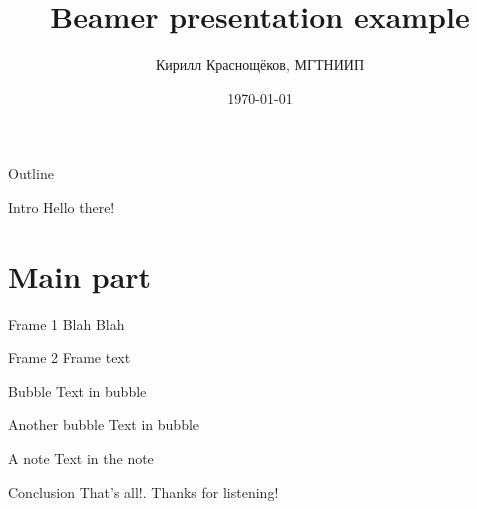 \documentclass[bigger]{beamer}
\author{Кирилл Краснощёков, МГТНИИП}
\date{\today}
\title{Beamer presentation example}
\begin{document}
\maketitle
\begin{frame}{Outline}
\tableofcontents
\end{frame}



\begin{frame}[label={sec:org33a5f70}]{Intro}
Hello there!
\end{frame}

\section{Main part}
\label{sec:orge7c996a}
\begin{frame}[label={sec:org4041f57}]{Frame 1}
Blah Blah
\end{frame}
\begin{frame}[label={sec:org32eac56}]{Frame 2}
Frame text
\begin{block}{Bubble}
Text in bubble
\end{block}
\begin{block}{Another bubble}
Text in bubble
\begin{block}{A note}
Text in the note
\end{block}
\end{block}
\end{frame}
\begin{frame}[label={sec:org1efc038}]{Conclusion}
That's all!. Thanks for listening!
\end{frame}
\end{document}
